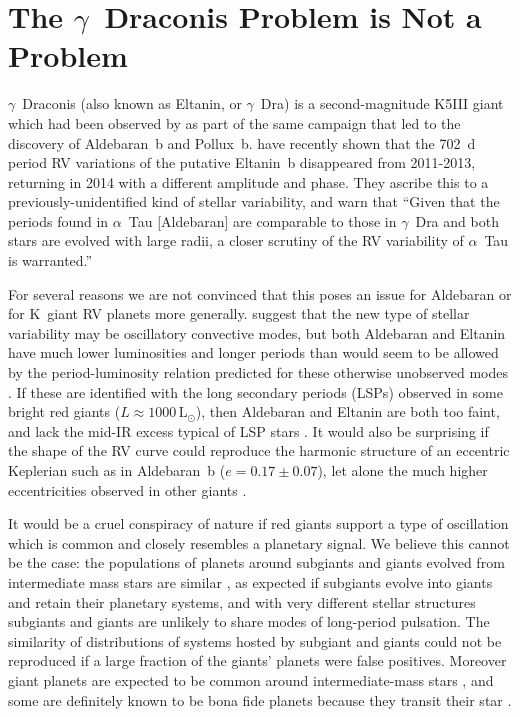 \documentclass[modern]{aastex61}
\newcommand{\lsun}{\mbox{$\mathrm{L}_{\odot}$}\xspace}
\newcommand{\twosidedrange}[3]{\ensuremath{#1^{+#2}_{-#3}}}
\newcommand{\EccentricityRange}{0.17\pm0.07} %
\begin{document}
\section{The $\gamma$~Draconis Problem is Not a Problem}
\label{gamma_dra}

$\gamma$~Draconis (also known as Eltanin, or $\gamma$~Dra) is a second-magnitude K5III giant which had been observed by \citet{hatzes1993} as part of the same campaign that led to the discovery of Aldebaran~b and Pollux~b. \citet{2018arXiv180105239H} have recently shown that the 702~d period RV variations of the putative Eltanin~b disappeared from 2011-2013, returning in 2014 with a different amplitude and phase. They ascribe this to a previously-unidentified kind of stellar variability, and warn that ``Given that the periods found in $\alpha$~Tau [Aldebaran] are comparable to those in $\gamma$~Dra and both stars are evolved with large radii, a closer scrutiny of the RV variability of $\alpha$~Tau is warranted.''

For several reasons we are not convinced that this poses an issue for Aldebaran or for K~giant RV planets more generally. \citet{2018arXiv180105239H} suggest that the new type of stellar variability may be oscillatory convective modes, but both Aldebaran and Eltanin have much lower luminosities and longer periods than would seem to be allowed by the period-luminosity relation predicted for these otherwise unobserved modes \citep[Figure~9]{2015MNRAS.452.3863S,2018arXiv180105239H}. If these are identified with the long secondary periods (LSPs) observed in some bright red giants ($L \approx 1000\, \lsun$), then Aldebaran and Eltanin are both too faint, and lack the mid-IR excess typical of LSP stars \citep{2009ApJ...707..573W}. It would also be surprising if the shape of the RV curve could reproduce the harmonic structure of an eccentric Keplerian such as in Aldebaran~b ($e = \EccentricityRange{}$), let alone the much higher eccentricities observed in other giants \citep[e.g. $\iota$~Dra~b, $e=0.7$:][]{2002ApJ...576..478F}.

It would be a cruel conspiracy of nature if red giants support a type of oscillation which is common and closely resembles a planetary signal. We believe this cannot be the case: the populations of planets around subgiants and giants evolved from intermediate mass stars are similar \citep{2014A&A...566A.113J}, as expected if subgiants evolve into giants and retain their planetary systems, and with very different stellar structures subgiants and giants are unlikely to share modes of long-period pulsation. The similarity of distributions of systems hosted by subgiant and giants could not be reproduced if a large fraction of the giants' planets were false positives. Moreover giant planets are expected to be common around intermediate-mass stars \citep{2008ApJ...673..502K}, and some are definitely known to be bona fide planets because they transit their star \citep[e.g.][]{2014A&A...562A.109L,2015A&A...573L...6O,2016AJ....152..185G,2017AJ....154..254G}.
\end{document}
